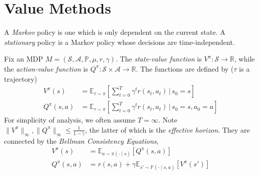 \documentclass[11pt, letterpaper]{article}
\begin{document}
\tableofcontents
\newpage

\part{Value Methods}

\begin{concept}
    A \textit{Markov} policy is one which is only dependent on the current state. A \textit{stationary} policy is a Markov policy whose decisions are time-independent. 
\end{concept}

\begin{concept}
    Fix an MDP \(M = (\mathcal{S}, \mathcal{A}, \mathbb{P}, \mu, r, \gamma)\). The \textit{state-value function} is \(V^\pi : \mathcal{S} \to \mathbb{R}\), while the \textit{action-value function} is \(Q^\pi : \mathcal{S} \times \mathcal{A} \to \mathbb{R}\). The functions are defined by (\(\tau\) is a trajectory)
    \begin{align*}
        V^\pi(s) &= \mathbb{E}_{\tau \sim \pi} \left[ \sum_{t=0}^T \gamma^t r(s_t, a_t) \,\biggr\rvert\, s_0 = s \right] \\
        Q^\pi(s, a) &= \mathbb{E}_{\tau \sim \pi} \left[ \sum_{t=0}^T \gamma^t r(s_t, a_t) \,\biggr\rvert\, s_0 = s, a_0 = a \right]
    \end{align*}
    For simplicity of analysis, we often assume \(T = \infty\). Note \(\|V^\pi\|_{\infty}, \|Q^\pi\|_{\infty} \leq \frac{1}{1 - \gamma}\), the latter of which is the \textit{effective horizon}. They are connected by the \textit{Bellman Consistency Equations}, 
    \begin{align*}
        V^\pi(s) &= \mathbb{E}_{a \sim \pi(\cdot \mid s)} [Q^\pi(s, a)] \\
        Q^\pi(s, a) &= r(s, a) + \gamma \mathbb{E}_{s' \sim \mathbb{P}(\cdot \mid s, a)} [V^\pi(s')]
    \end{align*}
\end{concept}
\end{document}
